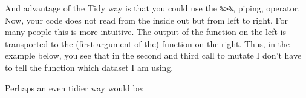\documentclass[
]{book}
\newenvironment{Shaded}{\begin{snugshade}}{\end{snugshade}}
\newcommand{\DataTypeTok}[1]{\textcolor[rgb]{0.13,0.29,0.53}{#1}}
\newcommand{\DecValTok}[1]{\textcolor[rgb]{0.00,0.00,0.81}{#1}}
\newcommand{\KeywordTok}[1]{\textcolor[rgb]{0.13,0.29,0.53}{\textbf{#1}}}
\newcommand{\NormalTok}[1]{#1}
\newcommand{\OperatorTok}[1]{\textcolor[rgb]{0.81,0.36,0.00}{\textbf{#1}}}
\newcommand{\OtherTok}[1]{\textcolor[rgb]{0.56,0.35,0.01}{#1}}
\newcommand{\StringTok}[1]{\textcolor[rgb]{0.31,0.60,0.02}{#1}}
\begin{document}
And advantage of the Tidy way is that you could use the \texttt{\%\textgreater{}\%}, piping, operator. Now, your code does not read from the inside out but from left to right. For many people this is more intuitive. The output of the function on the left is transported to the (first argument of the) function on the right. Thus, in the example below, you see that in the second and third call to mutate I don't have to tell the function which dataset I am using.

\begin{Shaded}
\end{Shaded}

Perhaps an even tidier way would be:
\end{document}
